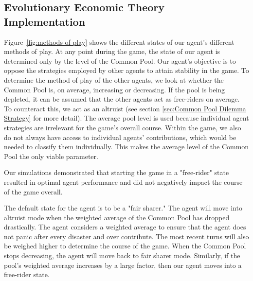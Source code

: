 \subsection{Evolutionary Economic Theory Implementation}

Figure~\ref{fig:methods-of-play} shows the different states of our agent's different methods of play. At any point during the game, the state of our agent is determined only by the level of the Common Pool. Our agent's objective is to oppose the strategies employed by other agents to attain stability in the game. To determine the method of play of the other agents, we look at whether the Common Pool is, on average, increasing or decreasing. If the pool is being depleted, it can be assumed that the other agents act as free-riders on average. To counteract this, we act as an altruist (see section \ref{sec:Common Pool Dilemma Strategy} for more detail). The average pool level is used because individual agent strategies are irrelevant for the game's overall course. Within the game, we also do not always have access to individual agents' contributions, which would be needed to classify them individually. This makes the average level of the Common Pool the only viable parameter. 

Our simulations demonstrated that starting the game in a "free-rider" state resulted in optimal agent performance and did not negatively impact the course of the game overall.

The default state for the agent is to be a "fair sharer." The agent will move into altruist mode when the weighted average of the Common Pool has dropped drastically. The agent considers a weighted average to ensure that the agent does not panic after every disaster and over contribute. The most recent turns will also be weighed higher to determine the course of the game. When the Common Pool stops decreasing, the agent will move back to fair sharer mode. Similarly, if the pool's weighted average increases by a large factor, then our agent moves into a free-rider state.

\begin{figure}
    \centering
\end{figure}



